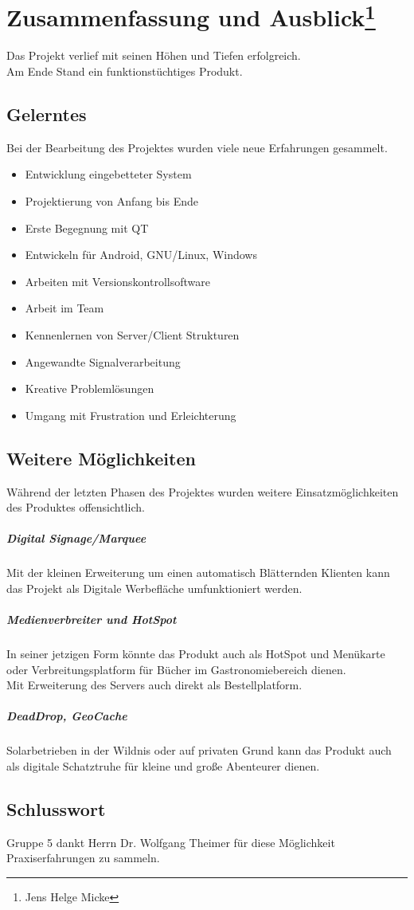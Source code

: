 \chapter[Zusammenfassung und Ausblick]{Zusammenfassung und Ausblick\footnote{Jens Helge Micke}}
\thispagestyle{fancy}
\label{Ausblick}
Das Projekt verlief mit seinen Höhen und Tiefen erfolgreich.\\
Am Ende Stand ein funktionstüchtiges Produkt.\\
\section{Gelerntes}
Bei der Bearbeitung des Projektes wurden viele neue Erfahrungen gesammelt.\\
\begin{itemize}
	\item Entwicklung eingebetteter System
	\item Projektierung von Anfang bis Ende
	\item Erste Begegnung mit QT
	\item Entwickeln für Android, GNU/Linux, Windows
	\item Arbeiten mit Versionskontrollsoftware
	\item Arbeit im Team
	\item Kennenlernen von Server/Client Strukturen
	\item Angewandte Signalverarbeitung
	\item Kreative Problemlösungen
	\item Umgang mit Frustration und Erleichterung
\end{itemize}
\section{Weitere Möglichkeiten}
Während der letzten Phasen des Projektes wurden weitere Einsatzmöglichkeiten des Produktes offensichtlich.
\paragraph{Digital Signage/Marquee}$\;$\\
Mit der kleinen Erweiterung um einen automatisch Blätternden Klienten kann das Projekt als Digitale Werbefläche umfunktioniert werden.
\paragraph{Medienverbreiter und HotSpot}$\;$\\
In seiner jetzigen Form könnte das Produkt auch als HotSpot und Menükarte oder Verbreitungsplatform für Bücher im Gastronomiebereich dienen.\\
Mit Erweiterung des Servers auch direkt als Bestellplatform.
\paragraph{DeadDrop, GeoCache}$\;$\\
Solarbetrieben in der Wildnis oder auf privaten Grund kann das Produkt auch als digitale Schatztruhe für kleine und große Abenteurer dienen.
\section{Schlusswort}
Gruppe 5 dankt Herrn Dr. Wolfgang Theimer für diese Möglichkeit Praxiserfahrungen zu sammeln.